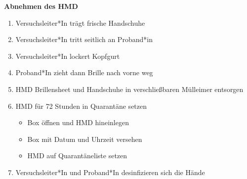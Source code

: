 \documentclass[24pt, a4paper, portrait]{article}
\begin{document}
\vspace{0.5cm}

\Large
\textbf{Abnehmen des HMD}

\large

\begin{enumerate}

    \item Versuchsleiter*In trägt frische Handschuhe
    \item Versuchsleiter*In tritt seitlich an Proband*in
    \item Versuchsleiter*In lockert Kopfgurt
    \item Proband*In zieht dann Brille nach vorne weg
    \item HMD Brillensheet und Handschuhe in verschließbaren Mülleimer entsorgen
    \item HMD für 72 Stunden in Quarantäne setzen
    \begin{itemize}
        \item Box öffnen und HMD hineinlegen
        \item Box mit Datum und Uhrzeit versehen
        \item HMD auf Quarantäneliste setzen
    \end{itemize}
    \item Versuchsleiter*In und Proband*In desinfizieren sich die Hände
\end{enumerate}
\end{document}
